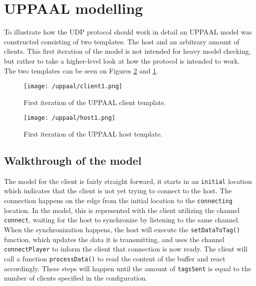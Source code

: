\section{UPPAAL modelling}\label{sec:sprint3-uppaal}
To illustrate how the UDP protocol should work in detail an UPPAAL model was constructed consisting of two templates: The host and an arbitrary amount of clients.
This first iteration of the model is not intended for heavy model checking, but rather to take a higher-level look at how the protocol is intended to work.
The two templates can be seen on Figures \ref{fig:uppaal-host-1} and \ref{fig:uppaal-client-1}.

\begin{figure}[H]
   \centering
    \texttt{[image: /uppaal/client1.png]}
    \caption{First iteration of the UPPAAL client template.}
    \label{fig:uppaal-client-1}
\end{figure}

\begin{figure}[H]
   \centering
    \texttt{[image: /uppaal/host1.png]}
    \caption{First iteration of the UPPAAL host template.}
    \label{fig:uppaal-host-1}
\end{figure}

\subsection{Walkthrough of the model}
The model for the client is fairly straight forward, it starts in an \texttt{initial} location which indicates that the client is not yet trying to connect to the host.
The connection happens on the edge from the initial location to the \texttt{connecting} location.
In the model, this is represented with the client utilizing the channel \texttt{connect}, waiting for the host to synchronize by listening to the same channel.
When the synchronization happens, the host will execute the \texttt{setDataToTag()} function, which updates the data it is transmitting, and uses the channel \texttt{connectPlayer} to inform the client that connection is now ready.
The client will call a function \texttt{processData()} to read the content of the buffer and react accordingly. 
These steps will happen until the amount of \texttt{tagsSent} is equal to the number of clients specified in the configuration.


